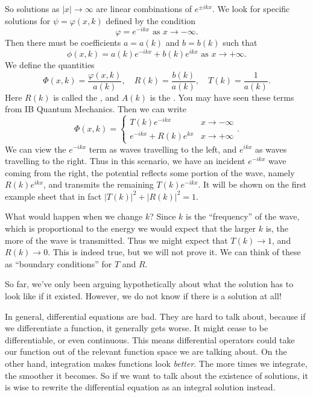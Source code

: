 \documentclass[a4paper]{article}
\begin{document}
So solutions as $|x| \to \infty$ are linear combinations of $e^{\pm i k x}$. We look for specific solutions for $\psi = \varphi(x, k)$ defined by the condition
\[
  \varphi = e^{-ikx}\text{ as } x \to -\infty.
\]
Then there must be coefficients $a = a(k)$ and $b = b(k)$ such that
\[
  \phi(x, k) = a(k) e^{-ikx} + b(k) e^{ikx}\text{ as }x \to +\infty.
\]
We define the quantities
\[
  \Phi(x, k) = \frac{\varphi(x, k)}{a(k)},\quad R(k) = \frac{b(k)}{a(k)},\quad T(k) = \frac{1}{a(k)}.
\]
Here $R(k)$ is called the , and $A(k)$ is the . You may have seen these terms from IB Quantum Mechanics. Then we can write
\[
  \Phi(x, k) =
  \begin{cases}
    T(k) e^{-ikx} & x \to -\infty\\
    e^{-ikx} + R(k) e^{kx} & x \to +\infty
  \end{cases}.
\]
We can view the $e^{-ikx}$ term as waves travelling to the left, and $e^{ikx}$ as waves travelling to the right. Thus in this scenario, we have an incident $e^{-ikx}$ wave coming from the right, the potential reflects some portion of the wave, namely $R(k) e^{ikx}$, and transmits the remaining $T(k) e^{-ikx}$. It will be shown on the first example sheet that in fact $|T(k)|^2 + |R(k)|^2 = 1$.

What would happen when we change $k$? Since $k$ is the ``frequency'' of the wave, which is proportional to the energy we would expect that the larger $k$ is, the more of the wave is transmitted. Thus we might expect that $T(k) \to 1$, and $R(k) \to 0$. This is indeed true, but we will not prove it. We can think of these as ``boundary conditions'' for $T$ and $R$.

So far, we've only been arguing hypothetically about what the solution has to look like if it existed. However, we do not know if there is a solution at all!

In general, differential equations are bad. They are hard to talk about, because if we differentiate a function, it generally gets worse. It might cease to be differentiable, or even continuous. This means differential operators could take our function out of the relevant function space we are talking about. On the other hand, integration makes functions look \emph{better}. The more times we integrate, the smoother it becomes. So if we want to talk about the existence of solutions, it is wise to rewrite the differential equation as an integral solution instead.
\end{document}
